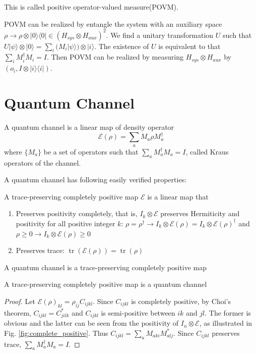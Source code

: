 \documentclass[12pt]{book}
\DeclareMathOperator{\tr}{tr}
\begin{document}
This is called positive operator-valued measure(POVM).

POVM can be realized by entangle the system with an auxiliary space $\rho\rightarrow \rho\otimes|0\rangle\langle 0|\in (H_{sys}\otimes H_{aux})^2$. We find a unitary transformation $U$ such that $U|\psi\rangle\otimes|0\rangle=\sum_i (M_i|\psi\rangle)\otimes |i\rangle$. The existence of $U$ is equivalent to that $\sum_i M_i^\dagger M_i=I$. Then POVM can be realized by measuring $H_{sys}\otimes H_{aux}$ by $(o_i,I\otimes |i\rangle\langle i|)$. 

\section{Quantum Channel}

A quantum channel is a linear map of density operator
\begin{equation}
	\mathcal E(\rho)=\sum_aM_a\rho M_a^\dagger
\end{equation}
where $\{M_a\}$ be a set of operators such that $\sum_a M_a^\dagger M_a=I$, called Kraus operators of the channel. 

A quantum channel has following easily verified properties:
\begin{definition}
	A trace-preserving completely positive map $\mathcal E$ is a linear map that
	\begin{enumerate}
		\item Preserves positivity completely, that is, $I_k\otimes\mathcal E$ preserves Hermiticity and positivity for all positive integer $k$: $\rho=\rho^\dagger\rightarrow I_k\otimes \mathcal E(\rho)= I_k\otimes \mathcal E(\rho)^\dagger$ and $\rho\geq 0\rightarrow I_k\otimes\mathcal E(\rho)\geq 0$
		\item Preserves trace: $\tr(\mathcal E(\rho))=\tr(\rho)$	
	\end{enumerate}
\end{definition}
\begin{lemma}
	A quantum channel is a trace-preserving completely positive map
\end{lemma}
\begin{lemma}
	A trace-preserving completely positive map is a quantum channel
\end{lemma}
\begin{proof}
	Let $\mathcal E(\rho)_{kl}=\rho_{ij}C_{ijkl}$. Since $C_{ijkl}$ is completely positive, by Choi's theorem, $C_{ijkl}=C^*_{jilk}$ and $C_{ijkl}$ is semi-positive between $ik$ and $jl$. The former is obvious and the latter can be seen from the positivity of $I_n\otimes \mathcal E$, as illustrated in Fig. \ref{fig:complete_positive}. Thus $C_{ijkl}=\sum_a M_{aki}M^*_{alj}$. Since $C_{ijkl}$ preserves trace, $\sum_a M_a^\dagger M_a=I$.
\end{proof}
\end{document}
